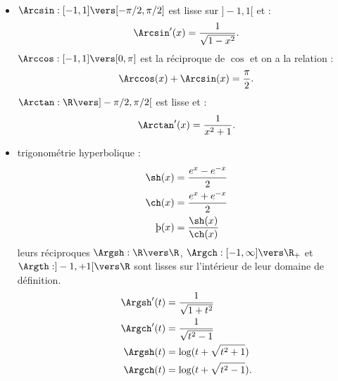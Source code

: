 \documentclass{mybourbaki}
\begin{document}
\begin{itemize}
\begin{align*}
\end{align*}
\item $\Arcsin : [-1,1] \vers [-\pi/2,\pi/2]$ est lisse sur $]-1,1[$ et : \[ \Arcsin' (x) = \frac{1}{\sqrt{1-x^{2}}}.\]$\Arccos : [-1,1] \vers [0,\pi]$ est la réciproque de $\cos$ et on a la relation : \[ \Arccos(x) + \Arcsin(x) = \frac{\pi}{2}.\]$\Arctan : \R\vers ]-\pi/2,\pi/2[$ est lisse et : \[ \Arctan'(x) = \frac{1}{x^{2}+1}.\]
\item trigonométrie hyperbolique : 
\begin{align*}
\sh(x) &= \frac{e^{x} - e^{-x}}{2} \\
\ch(x) &= \frac{e^{x} + e^{-x}}{2} \\
\th(x) &= \frac{\sh(x)}{\ch(x)}
\end{align*}leurs réciproques $\Argsh : \R \vers \R$, $\Argch : [-1,\infty]\vers \R_+$ et $\Argth:]-1,+1[ \vers \R$ sont lisses sur l'intérieur de leur domaine de définition.
\begin{align*}
\Argsh'(t) &= \frac{1}{\sqrt{1+t^{2}}} \\
\Argch'(t) &= \frac{1}{\sqrt{t^{2}-1}} \\
\Argsh(t) &= \log(t + \sqrt{t^{2}+1}) \\
\Argch(t) &= \log(t + \sqrt{t^{2}-1}).
\end{align*}
\end{itemize}

\end{document}
